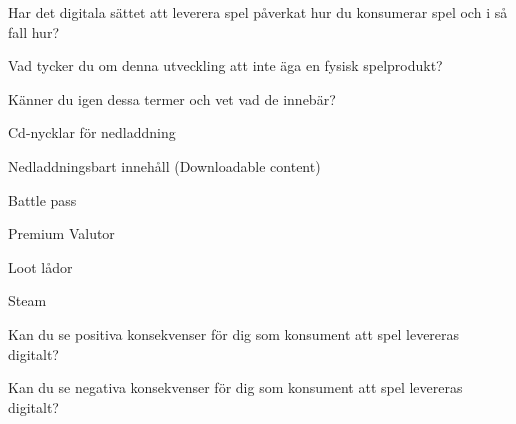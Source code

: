 \documentclass[11p]{article}
\begin{document}
\begin{otherlanguage}{swedish}
        Har det digitala sättet att leverera spel påverkat hur du konsumerar spel och i så fall hur?

        Vad tycker du om denna utveckling att inte äga en fysisk spelprodukt?

        Känner du igen dessa termer och vet vad de innebär?

        Cd-nycklar för nedladdning

        Nedladdningsbart innehåll  (Downloadable content)

        Battle pass

        Premium Valutor

        Loot lådor

        Steam

        Kan du se positiva konsekvenser för dig som konsument att spel levereras digitalt?

        Kan du se negativa konsekvenser för dig som konsument att spel levereras digitalt?



    \end{otherlanguage}
\end{document}
